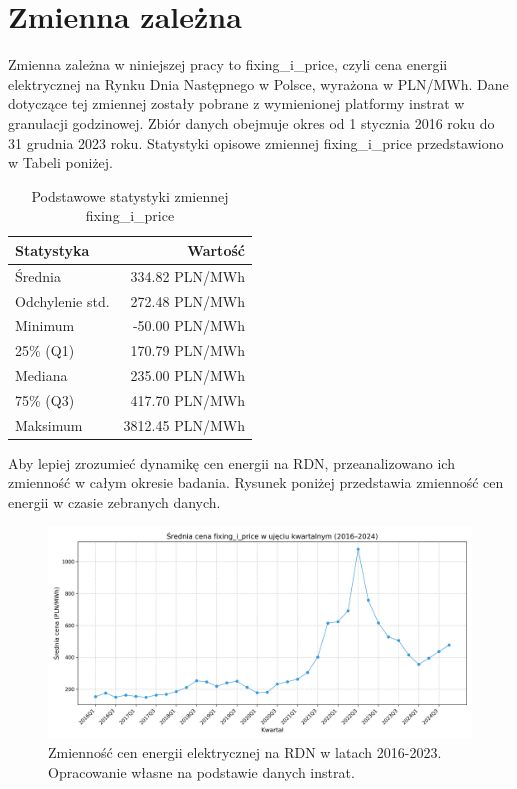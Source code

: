 \section{Zmienna zależna}
Zmienna zależna w niniejszej pracy to fixing\_i\_price, czyli cena energii elektrycznej na Rynku Dnia Następnego w Polsce, wyrażona w PLN/MWh. Dane dotyczące tej zmiennej zostały pobrane z wymienionej platformy instrat w granulacji godzinowej. Zbiór danych obejmuje okres od 1 stycznia 2016 roku do 31 grudnia 2023 roku. Statystyki opisowe zmiennej fixing\_i\_price przedstawiono w Tabeli poniżej. 
\begin{table}[H]
    \centering
    \begin{tabular}{|l|r|}
    \hline
    \textbf{Statystyka} & \textbf{Wartość} \\ \hline
    Średnia             & 334.82 PLN/MWh   \\ \hline
    Odchylenie std.     & 272.48 PLN/MWh   \\ \hline
    Minimum             & -50.00 PLN/MWh   \\ \hline
    25\% (Q1)           & 170.79 PLN/MWh   \\ \hline
    Mediana             & 235.00 PLN/MWh   \\ \hline
    75\% (Q3)           & 417.70 PLN/MWh   \\ \hline
    Maksimum            & 3812.45 PLN/MWh  \\ \hline
    \end{tabular}
    \caption{Podstawowe statystyki zmiennej fixing\_i\_price}
    \label{tab:fixing-i-price-stats}
\end{table}

Aby lepiej zrozumieć dynamikę cen energii na RDN, przeanalizowano ich zmienność w całym okresie badania. Rysunek poniżej przedstawia zmienność cen energii w czasie zebranych danych.

\begin{figure}[H]
    \centering
    \includegraphics[width=\textwidth]{../plots/quarterly_fixing_i_price.png}
    \caption{Zmienność cen energii elektrycznej na RDN w latach 2016-2023. Opracowanie własne na podstawie danych instrat.}
    \label{fig:fixing-i-price-trend}
\end{figure}

